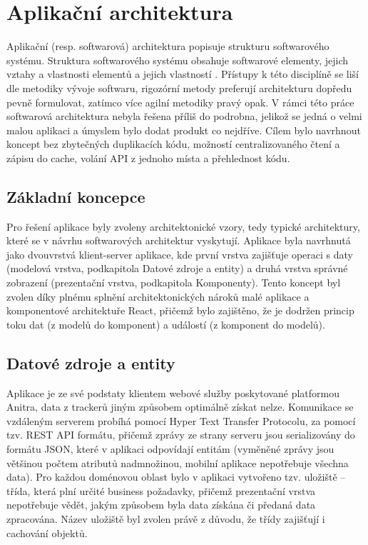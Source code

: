 \section{Aplikační architektura}

Aplikační (resp. softwarová) architektura popisuje strukturu softwarového systému. Struktura softwarového systému obsahuje softwarové elementy, jejich vztahy a vlastnosti elementů a jejich vlastností \cite{clements2010documenting}. Přístupy k této disciplíně se liší dle metodiky vývoje softwaru, rigozórní metody preferují architekturu dopředu pevně formulovat, zatímco více agilní metodiky pravý opak. V rámci této práce softwarová architektura nebyla řešena příliš do podrobna, jelikož se jedná o velmi malou aplikaci a úmyslem bylo dodat produkt co nejdříve. Cílem bylo navrhnout koncept bez zbytečných duplikacích kódu, možností centralizovaného čtení a zápisu do cache, volání API z jednoho místa a přehlednost kódu.

\subsection{Základní koncepce}

Pro řešení aplikace byly zvoleny architektonické vzory, tedy typické architektury, které se v návrhu softwarových architektur vyskytují. Aplikace byla navrhnutá jako dvouvrstvá klient-server aplikace, kde první vrstva zajišťuje operaci s daty (modelová vrstva, podkapitola Datové zdroje a entity) a druhá vrstva správné zobrazení (prezentační vrstva, podkapitola Komponenty). Tento koncept byl zvolen díky plnému splnění architektonických nároků malé aplikace a komponentové architektuře React, přičemž bylo zajištěno, že je dodržen princip toku dat (z modelů do komponent) a událostí (z komponent do modelů). 

\subsection{Datové zdroje a entity}

Aplikace je ze své podstaty klientem webové služby poskytované platformou Anitra, data z trackerů jiným způsobem optimálně získat nelze. Komunikace se vzdáleným serverem probíhá pomocí Hyper Text Transfer Protocolu, za pomocí tzv. REST API formátu, přičemž zprávy ze strany serveru jsou serializovány do formátu JSON, které v aplikaci odpovídají entitám (vyměněné zprávy jsou většinou počtem atributů nadmnožinou, mobilní aplikace nepotřebuje všechna data). Pro každou doménovou oblast bylo v aplikaci vytvořeno tzv. uložiště -- třída, která plní určité business požadavky, přičemž prezentační vrstva nepotřebuje vědět, jakým způsobem byla data získána či předaná data zpracována. Název uložiště byl zvolen právě z důvodu, že třídy zajišťují i cachování objektů.

